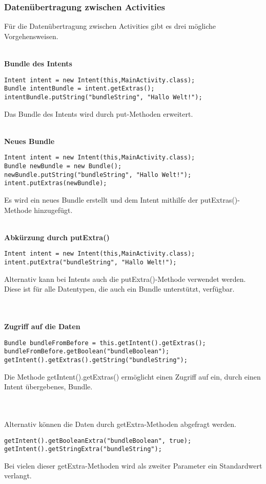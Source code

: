 \documentclass[FIPLY_base.tex]{subfiles}
\begin{document}
\subsubsection{Datenübertragung zwischen Activities}
Für die Datenübertragung zwischen Activities gibt es drei mögliche Vorgehensweisen.

\ \\
\textbf{Bundle des Intents}
\begin{lstlisting}[caption={Übertragung durch das Bundle des Intents},label=DescriptiveLabel]
Intent intent = new Intent(this,MainActivity.class);
Bundle intentBundle = intent.getExtras();
intentBundle.putString("bundleString", "Hallo Welt!");
\end{lstlisting} 
Das Bundle des Intents wird durch put-Methoden erweitert.

\ \\
\textbf{Neues Bundle}
\begin{lstlisting}[caption={Übertragung durch einen Intent mit einem neuen Bundle},label=DescriptiveLabel]
Intent intent = new Intent(this,MainActivity.class);
Bundle newBundle = new Bundle();
newBundle.putString("bundleString", "Hallo Welt!");
intent.putExtras(newBundle);
\end{lstlisting}
Es wird ein neues Bundle erstellt und dem Intent mithilfe der putExtras()-Methode hinzugefügt.

\newpage
\ \\
\textbf{Abkürzung durch putExtra()}
\begin{lstlisting}[caption={Abkürzung durch die putExtra()-Methode eines Intents},label=DescriptiveLabel]
Intent intent = new Intent(this,MainActivity.class);
intent.putExtra("bundleString", "Hallo Welt!");
\end{lstlisting} 
Alternativ kann bei Intents auch die putExtra()-Methode verwendet werden. Diese ist für alle Datentypen, die auch ein Bundle unterstützt, verfügbar.

\ \\

\ \\
\textbf{Zugriff auf die Daten}
\begin{lstlisting}[caption={Zugriff auf die Daten in der neuen Activity durch die getExtras()-Methode},label=DescriptiveLabel]
Bundle bundleFromBefore = this.getIntent().getExtras();
bundleFromBefore.getBoolean("bundleBoolean");
getIntent().getExtras().getString("bundleString");
\end{lstlisting}
Die Methode getIntent().getExtras() ermöglicht einen Zugriff auf ein, durch einen Intent übergebenes, Bundle.

\ \\
\ \\
Alternativ können die Daten durch getExtra-Methoden abgefragt werden.
\begin{lstlisting}[caption={Zugriff auf die Daten in der neuen Activity durch getExtra()-Methoden},label=DescriptiveLabel]
getIntent().getBooleanExtra("bundleBoolean", true);
getIntent().getStringExtra("bundleString");
\end{lstlisting}
Bei vielen dieser getExtra-Methoden wird als zweiter Parameter ein Standardwert verlangt.
\end{document}
